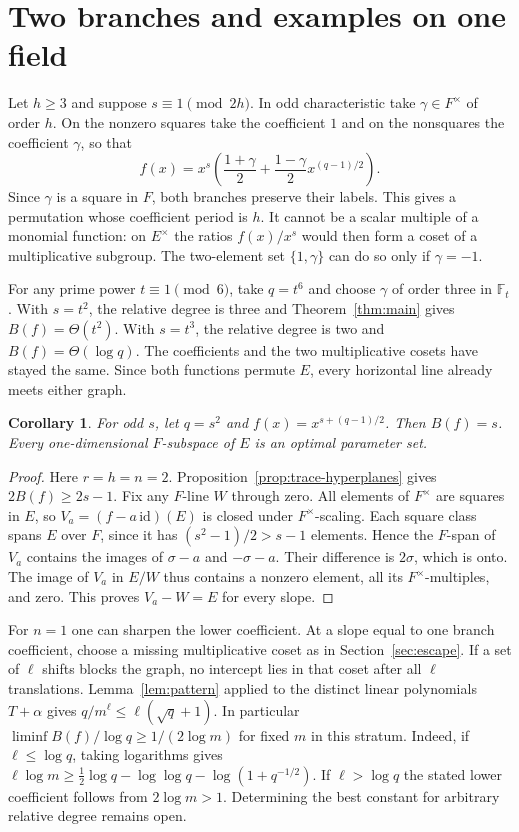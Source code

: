 \documentclass[preprint,12pt,numbers]{elsarticle}
\newtheorem{corollary}[theorem]{Corollary}
\begin{document}
\section{Two branches and examples on one field}\label{sec:examples}
Let $h\ge3$ and suppose $s\equiv1\pmod{2h}$. In odd characteristic take
$\gamma\in F^\times$ of order $h$. On the nonzero squares take the
coefficient $1$ and on the nonsquares the coefficient $\gamma$, so that
\[
 f(x)=x^s\left(\frac{1+\gamma}{2}
              +\frac{1-\gamma}{2}x^{(q-1)/2}\right).
\]
Since $\gamma$ is a square in $F$, both branches preserve their labels.
This gives a permutation whose coefficient period is $h$. It cannot
be a scalar multiple of a monomial function: on $E^\times$ the ratios
$f(x)/x^s$ would then form a coset of a multiplicative subgroup.
The two-element set $\{1,\gamma\}$ can do so only if $\gamma=-1$.

For any prime power $t\equiv1\pmod 6$, take $q=t^6$ and choose
$\gamma$ of order three in $\mathbb F_t$. With $s=t^2$, the relative
degree is three and Theorem~\ref{thm:main} gives $B(f)=\Theta(t^2)$.
With $s=t^3$, the relative degree is two and $B(f)=\Theta(\log q)$.
The coefficients and the two multiplicative cosets have stayed the same.
Since both functions permute $E$, every horizontal line already meets
either graph.

\begin{corollary}
For odd $s$, let $q=s^2$ and $f(x)=x^{s+(q-1)/2}$. Then $B(f)=s$.
Every one-dimensional $F$-subspace of $E$ is an optimal parameter set.
\end{corollary}
\begin{proof}
Here $r=h=n=2$. Proposition~\ref{prop:trace-hyperplanes} gives
$2B(f)\ge 2s-1$. Fix any $F$-line $W$ through zero. All elements of
$F^\times$ are squares in $E$, so $V_a=(f-a\,\mathrm{id})(E)$ is
closed under $F^\times$-scaling. Each square class spans $E$ over $F$,
since it has $(s^2-1)/2>s-1$ elements. Hence the $F$-span of $V_a$
contains the images of $\sigma-a$ and $-\sigma-a$. Their difference
is $2\sigma$, which is onto. The image of $V_a$ in $E/W$ thus contains
a nonzero element, all its $F^\times$-multiples, and zero. This proves
$V_a-W=E$ for every slope.
\end{proof}

For $n=1$ one can sharpen the lower coefficient. At a slope equal to
one branch coefficient, choose a missing multiplicative coset as in
Section~\ref{sec:escape}. If a set of $\ell$ shifts blocks the graph,
no intercept lies in that coset after all $\ell$ translations.
Lemma~\ref{lem:pattern} applied to the distinct linear polynomials
$T+\alpha$ gives $q/m^\ell\le\ell(\sqrt q+1)$.
In particular $\liminf B(f)/\log q\ge 1/(2\log m)$ for fixed $m$ in
this stratum. Indeed, if $\ell\le\log q$, taking logarithms gives
$\ell\log m\ge\tfrac12\log q-\log\log q-\log(1+q^{-1/2})$.
If $\ell>\log q$ the stated lower coefficient follows from
$2\log m>1$. Determining the best constant for arbitrary relative
degree remains open.
\end{document}
